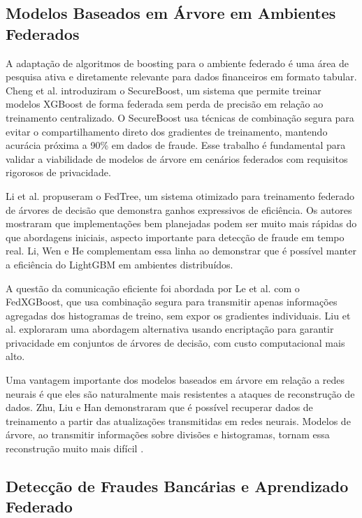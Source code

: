 \subsection{Modelos Baseados em Árvore em Ambientes Federados}

A adaptação de algoritmos de boosting para o ambiente federado é uma área de pesquisa ativa e diretamente relevante para dados financeiros em formato tabular. Cheng et al. \cite{cheng2021secureboost} introduziram o SecureBoost, um sistema que permite treinar modelos XGBoost de forma federada sem perda de precisão em relação ao treinamento centralizado. O SecureBoost usa técnicas de combinação segura para evitar o compartilhamento direto dos gradientes de treinamento, mantendo acurácia próxima a 90\% em dados de fraude. Esse trabalho é fundamental para validar a viabilidade de modelos de árvore em cenários federados com requisitos rigorosos de privacidade.

Li et al. \cite{li2023fedtree} propuseram o FedTree, um sistema otimizado para treinamento federado de árvores de decisão que demonstra ganhos expressivos de eficiência. Os autores mostraram que implementações bem planejadas podem ser muito mais rápidas do que abordagens iniciais, aspecto importante para detecção de fraude em tempo real. Li, Wen e He \cite{li2020practical} complementam essa linha ao demonstrar que é possível manter a eficiência do LightGBM em ambientes distribuídos.

A questão da comunicação eficiente foi abordada por Le et al. \cite{le2021fedxgboost} com o FedXGBoost, que usa combinação segura para transmitir apenas informações agregadas dos histogramas de treino, sem expor os gradientes individuais. Liu et al. \cite{liu2020fedforest} exploraram uma abordagem alternativa usando encriptação para garantir privacidade em conjuntos de árvores de decisão, com custo computacional mais alto.

Uma vantagem importante dos modelos baseados em árvore em relação a redes neurais é que eles são naturalmente mais resistentes a ataques de reconstrução de dados. Zhu, Liu e Han \cite{zhu2019deepleakage} demonstraram que é possível recuperar dados de treinamento a partir das atualizações transmitidas em redes neurais. Modelos de árvore, ao transmitir informações sobre divisões e histogramas, tornam essa reconstrução muito mais difícil \cite{liu2024survey}.

\subsection{Detecção de Fraudes Bancárias e Aprendizado Federado}

